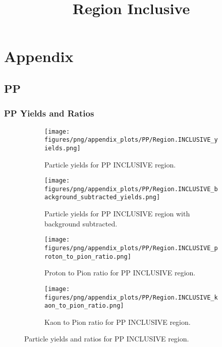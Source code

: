 \chapter{Appendix}

        \section{PP}
        
                \subsection*{PP Yields and Ratios}
                \begin{figure}[H]
                    \title{Region Inclusive}
                    \begin{subfigure}[b]{0.5\textwidth}
                        \centering
                        \texttt{[image: figures/png/appendix\_plots/PP/Region.INCLUSIVE\_yields.png]}
                        \caption{Particle yields for PP INCLUSIVE region.}
                        \label{fig:appendix_PP_INCLUSIVE_Inclusive_Yields}
                    \end{subfigure}
                    \begin{subfigure}[b]{0.5\textwidth}
                        \centering
                        \texttt{[image: figures/png/appendix\_plots/PP/Region.INCLUSIVE\_background\_subtracted\_yields.png]}
                        \caption{Particle yields for PP INCLUSIVE region with background subtracted.}
                        \label{fig:appendix_PP_INCLUSIVE_Inclusive_Yields_Background_Subtracted}
                    \end{subfigure}
                    \begin{subfigure}[b]{0.5\textwidth}
                        \centering
                        \texttt{[image: figures/png/appendix\_plots/PP/Region.INCLUSIVE\_proton\_to\_pion\_ratio.png]}
                        \caption{Proton to Pion ratio for PP INCLUSIVE region.}
                        \label{fig:appendix_PP_INCLUSIVE_Proton_to_Pion_Ratio}
                    \end{subfigure}
                    \begin{subfigure}[b]{0.5\textwidth}
                        \centering
                        \texttt{[image: figures/png/appendix\_plots/PP/Region.INCLUSIVE\_kaon\_to\_pion\_ratio.png]}
                        \caption{Kaon to Pion ratio for PP INCLUSIVE region.}
                        \label{fig:appendix_PP_INCLUSIVE_Kaon_to_Pion_Ratio}
                    \end{subfigure}
                    \caption{Particle yields and ratios for PP INCLUSIVE region.}
                    \label{fig:appendix_PP_INCLUSIVE_Inclusive_Yields_and_Ratios}
                \end{figure}

